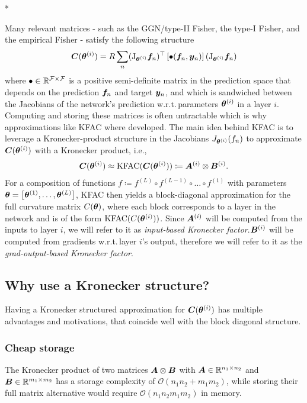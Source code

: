 \switchcolumn[1]*
\switchcolumn[0]

Many relevant matrices - such as the GGN/type-II Fisher, the type-I Fisher, and the empirical Fisher - satisfy the following structure
\begin{align*}
  {\bm{C}}({\bm{\theta}}^{(i)})
  = R \sum_n
  (\mathrm{J}_{{\bm{\theta}}^{(i)}} {\bm{f}}_n)^{\top}
  \left[ \bullet({\bm{f}}_n, {\bm{y}}_n) \right]
  (\mathrm{J}_{{\bm{\theta}}^{(i)}} {\bm{f}}_n)
\end{align*}
where $\bullet \in {\mathbb{R}}^{{\mathcal{F}} \times {\mathcal{F}}}$ is a positive semi-definite matrix in the prediction space that depends on the prediction ${\bm{f}}_n$ and target ${\bm{y}}_n$, and which is sandwiched between the Jacobians of the network's prediction w.r.t.\,parameters ${\bm{\theta}}^{(i)}$ in a layer $i$. Computing and storing these matrices is often untractable which is why approximations like KFAC where developed. The main idea behind KFAC is to leverage a Kronecker-product structure in the Jacobians $J_{{\bm{\theta}}^{(i)}}(f_n)$ to approximate ${\bm{C}}({\bm{\theta}}^{(i)})$ with a Kronecker product, i.e., 
\begin{align*}
  {\bm{C}}({\bm{\theta}}^{(i)})
  \approx
  \mathrm{KFAC}({\bm{C}}({\bm{\theta}}^{(i)}))
  \coloneqq {\bm{A}}^{(i)} \otimes {\bm{B}}^{(i)}.
\end{align*} 
For a composition of functions $f \coloneqq f^{(L)} \circ f^{(L-1)} \circ \dots \circ f^{(1)}$ with parameters ${\bm{\theta}} = \left[ {\bm{\theta}}^{(1)}, \dots, {\bm{\theta}}^{(L)} \right]$, KFAC then yields a block-diagonal approximation for the full curvature matrix $C({\bm{\theta}})$, where each block corresponds to a layer in the network and is of the form $\mathrm{KFAC}(C({\bm{\theta}}^{(i)}))$. Since ${\bm{A}}^{(i)}$ will be computed from the inputs to layer $i$, we will refer to it as \emph{input-based Kronecker factor}.${\bm{B}}^{(i)}$ will be computed from gradients w.r.t.\,layer $i$'s output, therefore we will refer to it as the \emph{grad-output-based Kronecker factor}.

\subsection{Why use a Kronecker structure?}
Having a Kronecker structured approximation for ${\bm{C}}({\bm{\theta}}^{(i)})$ has multiple advantages and motivations, that coincide well with the block diagonal structure. 
\subsubsection{Cheap storage}
The Kronecker product of two matrices ${\bm{A}} \otimes {\bm{B}}$ with ${\bm{A}} \in \mathbb{R}^{n_1 \times n_2}$ and ${\bm{B}} \in \mathbb{R}^{m_1 \times m_2}$ has a storage complexity of $\mathcal{O}(n_1 n_2 + m_1 m_2)$, while storing their full matrix alternative would require $\mathcal{O}(n_1n_2m_1m_2)$ in memory. 

